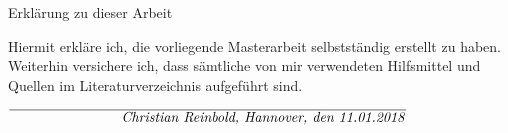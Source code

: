 \vspace*{\fill}

\begin{flushright}
	\Huge Erklärung zu dieser Arbeit
\end{flushright}

\vspace{1cm}

Hiermit erkläre ich, die vorliegende Masterarbeit selbstständig erstellt zu haben. Weiterhin versichere ich, dass sämtliche von mir verwendeten Hilfsmittel und Quellen im Literaturverzeichnis aufgeführt sind.

\vspace{2cm}

\begin{flushright}
	$\overline{\parbox{10cm}{\hfill\textit{\Student, Hannover, den \AbgabeDerArbeit}}}$
\end{flushright}

